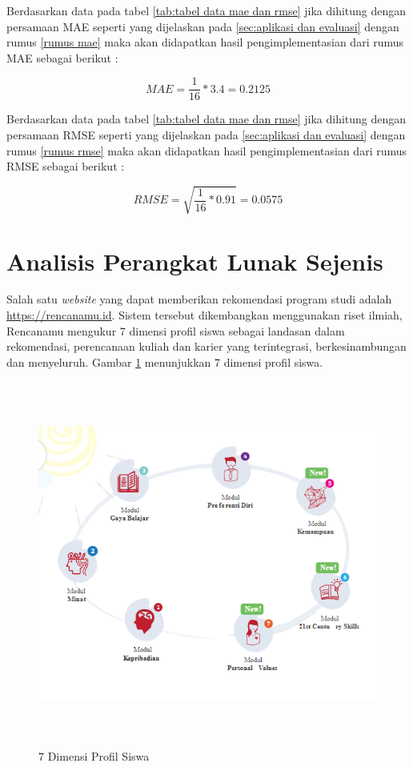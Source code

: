 Berdasarkan data pada tabel \ref{tab:tabel data mae dan rmse} jika dihitung dengan persamaan MAE seperti yang dijelaskan pada \ref{sec:aplikasi dan evaluasi} dengan rumus \ref{rumus mae} maka akan didapatkan hasil pengimplementasian dari rumus MAE sebagai berikut :

\begin{equation}
    MAE = \frac{1}{16} * 3.4 = 0.2125 
\end{equation}

Berdasarkan data pada tabel \ref{tab:tabel data mae dan rmse} jika dihitung dengan persamaan RMSE seperti yang dijelaskan pada \ref{sec:aplikasi dan evaluasi} dengan rumus \ref{rumus rmse} maka akan didapatkan hasil pengimplementasian dari rumus RMSE sebagai berikut :

\begin{equation}
    RMSE = \sqrt{\frac{1}{16} * 0.91} = 0.0575
\end{equation}

\section{Analisis Perangkat Lunak Sejenis}
\label{sec:analisis pl}

Salah satu \textit{website} yang dapat memberikan rekomendasi program studi adalah \url{https://rencanamu.id}. Sistem tersebut dikembangkan menggunakan riset ilmiah, Rencanamu mengukur 7 dimensi profil siswa sebagai landasan dalam rekomendasi, perencanaan kuliah dan karier yang terintegrasi, berkesinambungan dan menyeluruh. Gambar \ref{fig:7 dimensi siswa} menunjukkan 7 dimensi profil siswa. %

\begin{figure}[H]
    \centering
    \includegraphics[width = 12cm, height = 12cm]{Gambar/gambar31.PNG}
    \caption{7 Dimensi Profil Siswa}
    \label{fig:7 dimensi siswa}
\end{figure}


